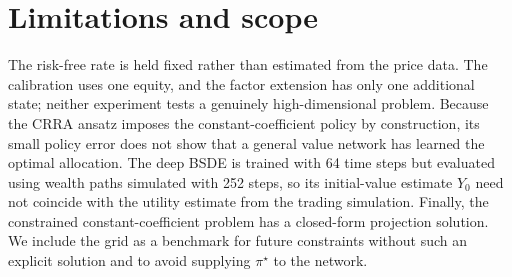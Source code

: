 \documentclass[11pt,a4paper]{article}
\begin{document}
\section{Limitations and scope}
\label{sec:limits}

The risk-free rate is held fixed rather than estimated from the price data. The calibration uses one equity, and the factor extension has only one additional state; neither experiment tests a genuinely high-dimensional problem. Because the CRRA ansatz imposes the constant-coefficient policy by construction, its small policy error does not show that a general value network has learned the optimal allocation. The deep BSDE is trained with 64 time steps but evaluated using wealth paths simulated with 252 steps, so its initial-value estimate $Y_0$ need not coincide with the utility estimate from the trading simulation. Finally, the constrained constant-coefficient problem has a closed-form projection solution. We include the grid as a benchmark for future constraints without such an explicit solution and to avoid supplying $\pi^{\star}$ to the network.



\end{document}
